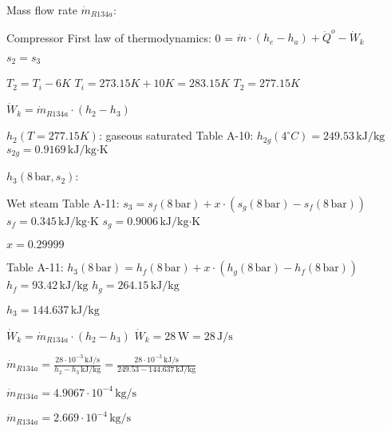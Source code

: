 Mass flow rate \( \dot{m}_{R134a} \):  

Compressor  
First law of thermodynamics:  
0 = \( \dot{m} \cdot (h_e - h_a) + \dot{Q}^o - \dot{W}_k \)  

\( s_2 = s_3 \)  

\( T_2 = T_i - 6K \)  
\( T_i = 273.15K + 10K = 283.15K \)  
\( T_2 = 277.15K \)  

\( \dot{W}_k = \dot{m}_{R134a} \cdot (h_2 - h_3) \)  

\( h_2 (T = 277.15K) \): gaseous saturated  
Table A-10:  
\( h_{2g} (4^\circ C) = 249.53 \, \text{kJ/kg} \)  
\( s_{2g} = 0.9169 \, \text{kJ/kg·K} \)  

\( h_3 (8 \, \text{bar}, s_2) \):  

Wet steam  
Table A-11:  
\( s_3 = s_f (8 \, \text{bar}) + x \cdot (s_g (8 \, \text{bar}) - s_f (8 \, \text{bar})) \)  
\( s_f = 0.345 \, \text{kJ/kg·K} \)  
\( s_g = 0.9006 \, \text{kJ/kg·K} \)  

\( x = 0.29999 \)  

Table A-11:  
\( h_3 (8 \, \text{bar}) = h_f (8 \, \text{bar}) + x \cdot (h_g (8 \, \text{bar}) - h_f (8 \, \text{bar})) \)  
\( h_f = 93.42 \, \text{kJ/kg} \)  
\( h_g = 264.15 \, \text{kJ/kg} \)  

\( h_3 = 144.637 \, \text{kJ/kg} \)  

\( \dot{W}_k = \dot{m}_{R134a} \cdot (h_2 - h_3) \)  
\( \dot{W}_k = 28 \, \text{W} = 28 \, \text{J/s} \)  

\( \dot{m}_{R134a} = \frac{28 \cdot 10^{-3} \, \text{kJ/s}}{h_2 - h_3 \, \text{kJ/kg}} = \frac{28 \cdot 10^{-3} \, \text{kJ/s}}{249.53 - 144.637 \, \text{kJ/kg}} \)  

\( \dot{m}_{R134a} = 4.9067 \cdot 10^{-4} \, \text{kg/s} \)  

\( \dot{m}_{R134a} = 2.669 \cdot 10^{-4} \, \text{kg/s} \)